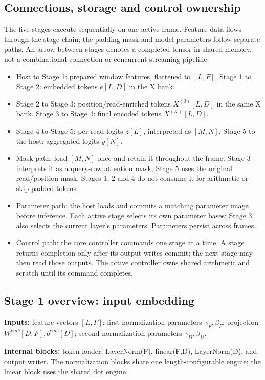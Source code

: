 \subsection{Connections, storage and control ownership}
The five stages execute sequentially on one active frame. Feature data flows through the stage chain; the padding mask and model parameters follow separate paths. An arrow between stages denotes a completed tensor in shared memory, not a combinational connection or concurrent streaming pipeline.
\begin{itemize}
\item Host to Stage 1: prepared window features, flattened to $[L,F]$. Stage 1 to Stage 2: embedded tokens $e[L,D]$ in the X bank.
\item Stage 2 to Stage 3: position/read-enriched tokens $X^{(0)}[L,D]$ in the same X bank. Stage 3 to Stage 4: final encoded tokens $X^{(K)}[L,D]$.
\item Stage 4 to Stage 5: per-read logits $z[L]$, interpreted as $[M,N]$. Stage 5 to the host: aggregated logits $y[N]$.
\item Mask path: load $[M,N]$ once and retain it throughout the frame. Stage 3 interprets it as a query-row attention mask; Stage 5 uses the original read/position mask. Stages 1, 2 and 4 do not consume it for arithmetic or skip padded tokens.
\item Parameter path: the host loads and commits a matching parameter image before inference. Each active stage selects its own parameter bases; Stage 3 also selects the current layer's parameters. Parameters persist across frames.
\item Control path: the core controller commands one stage at a time. A stage returns completion only after its output writes commit; the next stage may then read those outputs. The active controller owns shared arithmetic and scratch until its command completes.
\end{itemize}

\subsection{Stage 1 overview: input embedding}
\textbf{Inputs:} feature vectors $[L,F]$; first normalization parameters $\gamma_F,\beta_F$; projection $W^{emb}[D,F],b^{emb}[D]$; second normalization parameters $\gamma_D,\beta_D$.

\textbf{Internal blocks:} token loader, LayerNorm(F), linear(F,D), LayerNorm(D), and output writer. The normalization blocks share one length-configurable engine; the linear block uses the shared dot engine.


